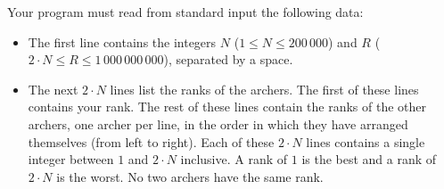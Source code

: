 Your program must read from standard input the following data:
\begin{itemize}
\item The first line contains the integers $N$ ($1 \le N \le 200\,000$) and $R$ ($2 \cdot N \le R \le 1\,000\,000\,000$), separated by a space.
\item The next $2 \cdot N$ lines list the ranks of the archers. The first of these lines contains your rank. The rest of these lines contain the ranks of the other archers, one archer per line, in the order in which they have arranged themselves (from left to right). Each of these $2 \cdot N$ lines contains a single integer between $1$ and $2 \cdot N$ inclusive. A rank of $1$ is the best and a rank of $2 \cdot N$ is the worst. No two archers have the same rank.
\end{itemize}
